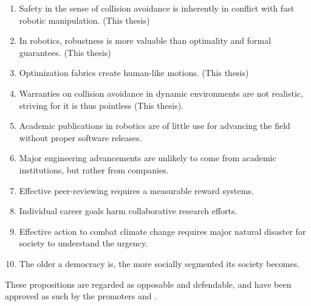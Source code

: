 \documentclass[nativefonts]{src/TUD-dissertation2020}
\begin{document}
\begin{enumerate}

  \item Safety in the sense of collision avoidance is inherently in conflict
    with fast robotic manipulation. (This thesis)
  \item In robotics, robustness is more valuable than optimality and formal
    guarantees. (This thesis)
  \item Optimization fabrics create human-like motions. (This thesis)
  \item Warranties on collision avoidance in dynamic environments are not
    realistic, striving for it is thus pointless (This thesis).
  \item Academic publications in robotics are of little use for advancing the
    field without proper software releases.
  \item Major engineering advancements are unlikely to come from academic
    institutions, but rather from companies.
  \item Effective peer-reviewing requires a measurable reward systems.
  \item Individual career goals harm collaborative research efforts.
  \item Effective action to combat climate change requires major natural disaster
    for society to understand the urgency.
  \item The older a democracy is, the more socially
    segmented its society becomes.
\end{enumerate}

\bigskip
\bigskip

\begin{center}
These propositions are regarded as opposable and defendable, and have been
  approved as such by the promoters \promotor{} and \copromotor{}.
\end{center}

\clearpage
\end{document}
